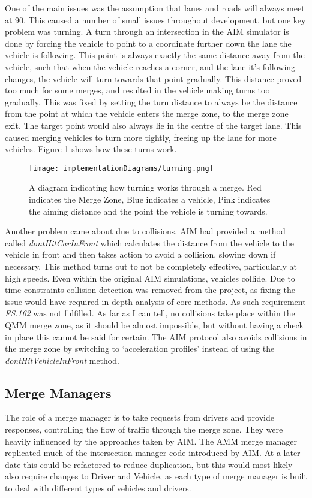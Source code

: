 One of the main issues was the assumption that lanes and roads will always meet at 90\degree. This caused a number of small issues throughout development, but one key problem was turning. A turn through an intersection in the AIM simulator is done by forcing the vehicle to point to a coordinate further down the lane the vehicle is following. This point is always exactly the same distance away from the vehicle, such that when the vehicle reaches a corner, and the lane it's following changes, the vehicle will turn towards that point gradually. This distance proved too much for some merges, and resulted in the vehicle making turns too gradually. This was fixed by setting the turn distance to always be the distance from the point at which the vehicle enters the merge zone, to the merge zone exit. The target point would also always lie in the centre of the target lane. This caused merging vehicles to turn more tightly, freeing up the lane for more vehicles. Figure \ref{fig:turning} shows how these turns work.

\begin{figure}[htb]
\texttt{[image: implementationDiagrams/turning.png]}
\caption{A diagram indicating how turning works through a merge. Red indicates the Merge Zone, Blue indicates a vehicle, Pink indicates the aiming distance and the point the vehicle is turning towards.}
\label{fig:turning}
\end{figure}

Another problem came about due to collisions. AIM had provided a method called \emph{dontHitCarInFront} which calculates the distance from the vehicle to the vehicle in front and then takes action to avoid a collision, slowing down if necessary. This method turns out to not be completely effective, particularly at high speeds. Even within the original AIM simulations, vehicles collide. Due to time constraints collision detection was removed from the project, as fixing the issue would have required in depth analysis of core methods. As such requirement \emph{FS.162} was not fulfilled. As far as I can tell, no collisions take place within the QMM merge zone, as it should be almost impossible, but without having a check in place this cannot be said for certain. The AIM protocol also avoids collisions in the merge zone by switching to `acceleration profiles' instead of using the \emph{dontHitVehicleInFront} method.

\subsection{Merge Managers}
\label{subsec:Merge Managers}
The role of a merge manager is to take requests from drivers and provide responses, controlling the flow of traffic through the merge zone. They were heavily influenced by the approaches taken by AIM. The AMM merge manager replicated much of the intersection manager code introduced by AIM. At a later date this could be refactored to reduce duplication, but this would most likely also require changes to Driver and Vehicle, as each type of merge manager is built to deal with different types of vehicles and drivers.

